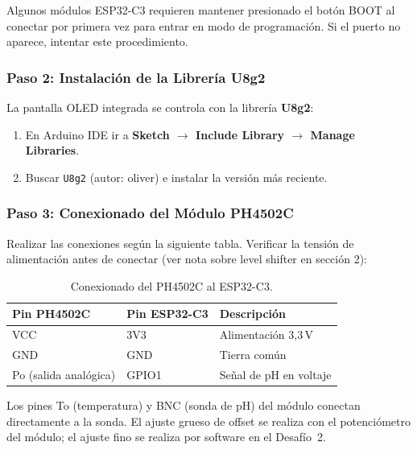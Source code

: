 \documentclass[12pt,leqno]{article}
\begin{document}
\begin{notabox}[Importante]
Algunos m\'odulos ESP32-C3 requieren mantener presionado el bot\'on BOOT al
conectar por primera vez para entrar en modo de programaci\'on. Si el puerto no
aparece, intentar este procedimiento.
\end{notabox}

\subsubsection*{Paso 2: Instalaci\'on de la Librer\'ia U8g2}

La pantalla OLED integrada se controla con la librer\'ia \textbf{U8g2}:

\begin{enumerate}[(1)]
    \item En Arduino IDE ir a \textbf{Sketch $\rightarrow$ Include Library
    $\rightarrow$ Manage Libraries}.
    \item Buscar \texttt{U8g2} (autor: oliver) e instalar la versi\'on m\'as
    reciente.
\end{enumerate}

\subsubsection*{Paso 3: Conexionado del M\'odulo PH4502C}

Realizar las conexiones seg\'un la siguiente tabla. Verificar la tensi\'on de
alimentaci\'on antes de conectar (ver nota sobre level shifter en secci\'on 2):

\begin{table}[h]
\centering
\begin{tabular}{|p{4cm}|p{4cm}|p{5cm}|}
\hline
\textbf{Pin PH4502C} & \textbf{Pin ESP32-C3} & \textbf{Descripci\'on} \\
\hline
VCC & 3V3 & Alimentaci\'on 3,3\,V \\
\hline
GND & GND & Tierra com\'un \\
\hline
Po (salida anal\'ogica) & GPIO1 & Se\~nal de pH en voltaje \\
\hline
\end{tabular}
\caption{Conexionado del PH4502C al ESP32-C3.}
\end{table}

\noindent Los pines To (temperatura) y BNC (sonda de pH) del m\'odulo conectan
directamente a la sonda. El ajuste grueso de offset se realiza con el
potenci\'ometro del m\'odulo; el ajuste fino se realiza por software en el
Desaf\'io~2.
\end{document}
